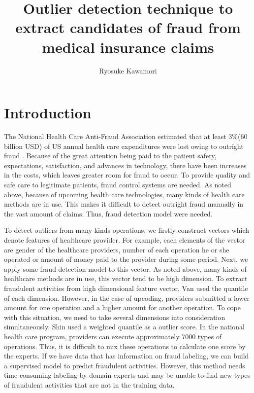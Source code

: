 \documentclass[dvipdfmx, english]{ampmt}             %
\title[Outlier detection technique to extract candidates of fraud from medical insurance claims]
      {Outlier detection technique to extract candidates of fraud from medical insurance claims}
\author{Ryosuke Kawamori}
\begin{document}
\ifoutputbody
\makeinsidecover                %
\makeabstract                   %
\maketoc                        %
\setcounter{page}{1}

\section{Introduction}
The National Health Care Anti-Fraud Association estimated that at least 3$\%$(60 billion USD) of US annual health care expenditures were lost owing to outright fraud \cite{Survey}. 
Because of the great attention being paid to the patient safety, expectations, satisfaction, and advances in technology, there have been increases in the costs, which leaves greater room for fraud to occur\cite{Dean}.
To provide quality and safe care to legitimate patients, fraud control systems are needed. As noted above, because of upcoming health care technologies, many kinds of health care methods are in use. This makes it difficult to detect outright fraud manually in the vast amount of claims.
Thus, fraud detection model were needed.  \par
To detect outliers from many kinds operations, we firstly construct vectors which denote features of healthcare provider. For example, each elements of the vector are gender of the healthcare providers, number of  each operation he or she operated or amount of money paid to the provider during some period. Next, we apply
some fraud detection model to this vector. As noted above, many kinds of healthcare methods are in use, this vector tend to be high dimension. To extract fraudulent activities from high dimensional feature vector, Van \cite{Van} used the quantile of each dimension. However, in the case of upcoding, providers submitted a lower amount for one operation and a higher amount for another operation. To cope with this situation, we need to take several dimensions into consideration simultaneously. Shin \cite{Shin} used a weighted quantile as a outlier score. In the national health care program, providers can execute approximately 7000 types of operations. Thus, it is difficult to mix these operations to calculate one score by the experts. If we have data that has information on fraud labeling, we can build a supervised model to predict fraudulent activities. However, this method needs time-consuming labeling by domain experts and may be unable to find new types of fraudulent activities that are not in the training data. 
\end{document}
